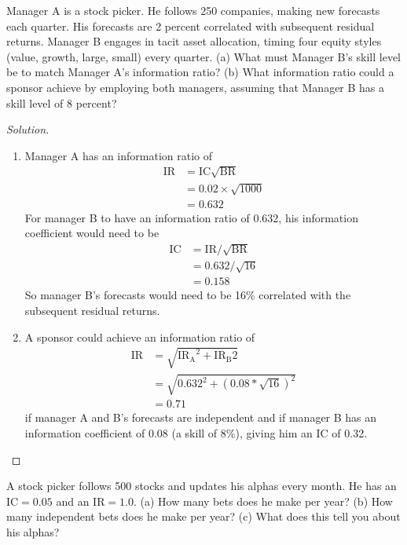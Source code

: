 \begin{problem}{6.1}
  Manager A is a stock picker. He follows 250 companies, making new forecasts each quarter. His forecasts are 2 percent correlated with subsequent residual returns. Manager B engages in tacit asset allocation, timing four equity styles (value, growth, large, small) every quarter. (a) What must Manager B's skill level be to match Manager A's information ratio? (b) What information ratio could a sponsor achieve by employing both managers, assuming that Manager B has a skill level of 8 percent?
\end{problem}

\begin{proof}[Solution]
 \quad\newline
 \begin{enumerate}[label=(\alph*)]
   \item{Manager A has an information ratio of
	\begin{align*}
	 \mathrm{IR}&=\mathrm{IC}\sqrt{\mathrm{BR}}\\
	            &=0.02\times\sqrt{1000}\\
	            &=0.632
	\end{align*}
	For manager B to have an information ratio of 0.632, his information coefficient would need to be
	\begin{align*}
	 \mathrm{IC}&=\mathrm{IR}/\sqrt{\mathrm{BR}}\\
		    &=0.632/\sqrt{16}\\
		    &=0.158
	\end{align*}
	So manager B's forecasts would need to be 16\% correlated with the subsequent residual returns.
	}
  \item{A sponsor could achieve an information ratio of
      \begin{align*}
	\mathrm{IR}&=\sqrt{\mathrm{IR_{A}}^{2} + \mathrm{IR_{B}}{2}}\\
	      &=\sqrt{0.632^{2} + (0.08*\sqrt{16})^{2}}\\
	      &=0.71
      \end{align*}
      if manager A and B's forecasts are independent and if manager B has an information coefficient of 0.08 (a skill of 8\%), giving him an IC of 0.32.
    }
 \end{enumerate}
\end{proof}

\begin{problem}{6.2}
 A stock picker follows 500 stocks and updates his alphas every month. He has an $\mathrm{IC}=0.05$ and an $\mathrm{IR}=1.0$. (a) How many bets does he make per year? (b) How many independent bets does he make per year? (c) What does this tell you about his alphas?
\end{problem}

